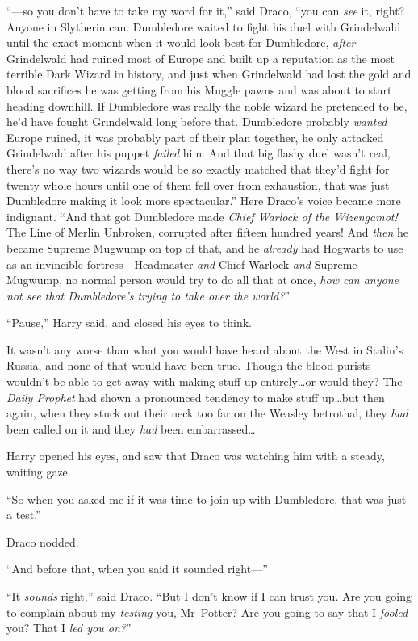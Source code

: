 “—so you don’t have to take my word for it,” said Draco, “you can \emph{see} it, right? Anyone in Slytherin can. Dumbledore waited to fight his duel with Grindelwald until the exact moment when it would look best for Dumbledore, \emph{after} Grindelwald had ruined most of Europe and built up a reputation as the most terrible Dark Wizard in history, and just when Grindelwald had lost the gold and blood sacrifices he was getting from his Muggle pawns and was about to start heading downhill. If Dumbledore was really the noble wizard he pretended to be, he’d have fought Grindelwald long before that. Dumbledore probably \emph{wanted} Europe ruined, it was probably part of their plan together, he only attacked Grindelwald after his puppet \emph{failed} him. And that big flashy duel wasn’t real, there’s no way two wizards would be so exactly matched that they’d fight for twenty whole hours until one of them fell over from exhaustion, that was just Dumbledore making it look more spectacular.” Here Draco’s voice became more indignant. “And that got Dumbledore made \emph{Chief Warlock of the Wizengamot!} The Line of Merlin Unbroken, corrupted after fifteen hundred years! And \emph{then} he became Supreme Mugwump on top of that, and he \emph{already} had Hogwarts to use as an invincible fortress—Headmaster \emph{and} Chief Warlock \emph{and} Supreme Mugwump, no normal person would try to do all that at once, \emph{how can anyone not see that Dumbledore’s trying to take over the world?}”

“Pause,” Harry said, and closed his eyes to think.

It wasn’t any worse than what you would have heard about the West in Stalin’s Russia, and none of that would have been true. Though the blood purists wouldn’t be able to get away with making stuff up entirely…or would they? The \emph{Daily Prophet} had shown a pronounced tendency to make stuff up…but then again, when they stuck out their neck too far on the Weasley betrothal, they \emph{had} been called on it and they \emph{had} been embarrassed…

Harry opened his eyes, and saw that Draco was watching him with a steady, waiting gaze.

“So when you asked me if it was time to join up with Dumbledore, that was just a test.”

Draco nodded.

“And before that, when you said it sounded right—”

“It \emph{sounds} right,” said Draco. “But I don’t know if I can trust you. Are you going to complain about my \emph{testing} you, Mr~Potter? Are you going to say that I \emph{fooled} you? That I \emph{led you on?}”

